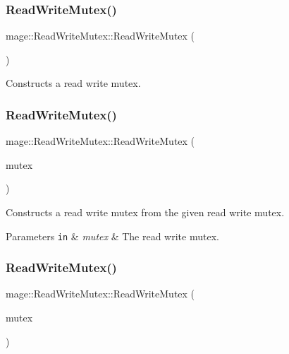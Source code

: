 \subsubsection{\texorpdfstring{Read\+Write\+Mutex()}{ReadWriteMutex()}\hspace{0.1cm}{\footnotesize\ttfamily [1/3]}}
{\footnotesize\ttfamily mage\+::\+Read\+Write\+Mutex\+::\+Read\+Write\+Mutex (\begin{DoxyParamCaption}{ }\end{DoxyParamCaption})}

Constructs a read write mutex. \hypertarget{classmage_1_1_read_write_mutex_aacb2f69e7e2b084147e1e45628e9dd67}{}\label{classmage_1_1_read_write_mutex_aacb2f69e7e2b084147e1e45628e9dd67} 
\subsubsection{\texorpdfstring{Read\+Write\+Mutex()}{ReadWriteMutex()}\hspace{0.1cm}{\footnotesize\ttfamily [2/3]}}
{\footnotesize\ttfamily mage\+::\+Read\+Write\+Mutex\+::\+Read\+Write\+Mutex (\begin{DoxyParamCaption}\item[{const \hyperlink{classmage_1_1_read_write_mutex}{Read\+Write\+Mutex} \&}]{mutex }\end{DoxyParamCaption})\hspace{0.3cm}{\ttfamily [delete]}}

Constructs a read write mutex from the given read write mutex.


\begin{DoxyParams}[1]{Parameters}
\mbox{\tt in}  & {\em mutex} & The read write mutex. \\
\hline
\end{DoxyParams}
\hypertarget{classmage_1_1_read_write_mutex_a664e946edfa742dad648fc9fcb29832e}{}\label{classmage_1_1_read_write_mutex_a664e946edfa742dad648fc9fcb29832e} 
\subsubsection{\texorpdfstring{Read\+Write\+Mutex()}{ReadWriteMutex()}\hspace{0.1cm}{\footnotesize\ttfamily [3/3]}}
{\footnotesize\ttfamily mage\+::\+Read\+Write\+Mutex\+::\+Read\+Write\+Mutex (\begin{DoxyParamCaption}\item[{\hyperlink{classmage_1_1_read_write_mutex}{Read\+Write\+Mutex} \&\&}]{mutex }\end{DoxyParamCaption})\hspace{0.3cm}{\ttfamily [delete]}}

